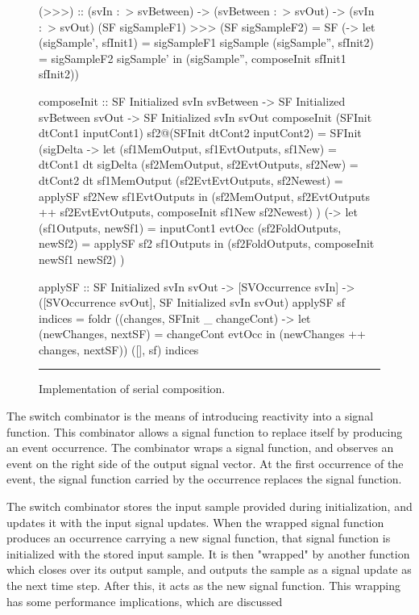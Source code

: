 \begin{figure}
\begin{code}
(>>>) ::    (svIn :~> svBetween) 
         -> (svBetween :~> svOut)
         -> (svIn :~> svOut)
(SF sigSampleF1) >>> (SF sigSampleF2) =
  SF (\sigSample -> let (sigSample', sfInit1) = sigSampleF1 sigSample
                        (sigSample'', sfInit2) = sigSampleF2 sigSample'
                    in (sigSample'', composeInit sfInit1 sfInit2))

composeInit ::     SF Initialized svIn svBetween
                -> SF Initialized svBetween svOut
                -> SF Initialized svIn svOut
composeInit (SFInit dtCont1 inputCont1) sf2@(SFInit dtCont2 inputCont2) =
  SFInit
    (\dt sigDelta -> 
       let (sf1MemOutput, sf1EvtOutputs, sf1New) = dtCont1 dt sigDelta
           (sf2MemOutput, sf2EvtOutputs, sf2New) = dtCont2 dt sf1MemOutput
           (sf2EvtEvtOutputs, sf2Newest) = applySF sf2New sf1EvtOutputs
       in (sf2MemOutput,
           sf2EvtOutputs ++ sf2EvtEvtOutputs,
           composeInit sf1New sf2Newest)
    )
    (\evtOcc -> 
      let (sf1Outputs, newSf1) = inputCont1 evtOcc
          (sf2FoldOutputs, newSf2) = applySF sf2 sf1Outputs
      in (sf2FoldOutputs, composeInit newSf1 newSf2)   
    )

applySF ::    SF Initialized svIn svOut
           -> [SVOccurrence svIn]
           -> ([SVOccurrence svOut],
               SF Initialized svIn svOut)
applySF sf indices =
  foldr (\evtOcc (changes, SFInit _ changeCont) ->
           let (newChanges, nextSF) = changeCont evtOcc
               in (newChanges ++ changes, nextSF))
        ([], sf)
        indices
\end{code}
\hrule
\caption{Implementation of serial composition.}
\label{figure:serial_composition_implementation}
\end{figure}

The switch combinator is the means of introducing reactivity into a signal
function. This combinator allows a signal function to replace itself by
producing an event occurrence. The combinator wraps a signal function, and 
observes an event on the right side of the output signal vector. At the first
occurrence of the event, the signal function carried by the occurrence replaces
the signal function. 

The switch combinator stores the input sample provided during initialization,
and updates it with the input signal updates. When the wrapped signal function
produces an occurrence carrying a new signal function, that signal function is
initialized with the stored input sample. It is then "wrapped" by another
function which closes over its output sample, and outputs the sample as a signal
update as the next time step. After this, it acts as the new signal function.
This wrapping has some performance implications, which are discussed 


